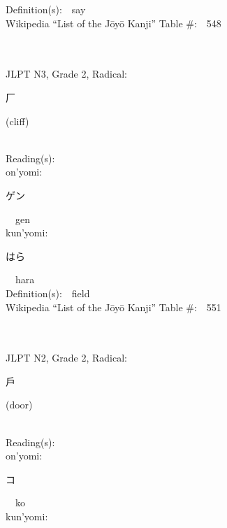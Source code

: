 \begin{multicols}{2}
Definition(s):\ \ say \\
Wikipedia ``List of the J\=oy\=o Kanji'' Table \#:\ \ 548 \\
\ \ \\
{\fontsize{34pt}{40pt}  }\ \ \\  %
{JLPT N3, Grade 2, Radical:\ \ {\begin{CJK}{UTF8}{min} 厂 \end{CJK}} (cliff) } \\
Reading(s):\ \ \\
{\hspace*{1em}}on'yomi:\ \ \\
{\hspace*{2em}}{\begin{CJK}{UTF8}{min} ゲン \end{CJK}}\ \ gen\ \ \\
{\hspace*{1em}}kun'yomi:\ \ \\
{\hspace*{2em}}{\begin{CJK}{UTF8}{min} はら \end{CJK}}\ \ hara\ \ \\
Definition(s):\ \ field \\
Wikipedia ``List of the J\=oy\=o Kanji'' Table \#:\ \ 551 \\
\ \ \\
{\fontsize{34pt}{40pt}  }\ \ \\  %
{JLPT N2, Grade 2, Radical:\ \ {\begin{CJK}{UTF8}{min} 戶 \end{CJK}} (door) } \\
Reading(s):\ \ \\
{\hspace*{1em}}on'yomi:\ \ \\
{\hspace*{2em}}{\begin{CJK}{UTF8}{min} コ \end{CJK}}\ \ ko\ \ \\
{\hspace*{1em}}kun'yomi:\ \ \\

\end{multicols}
